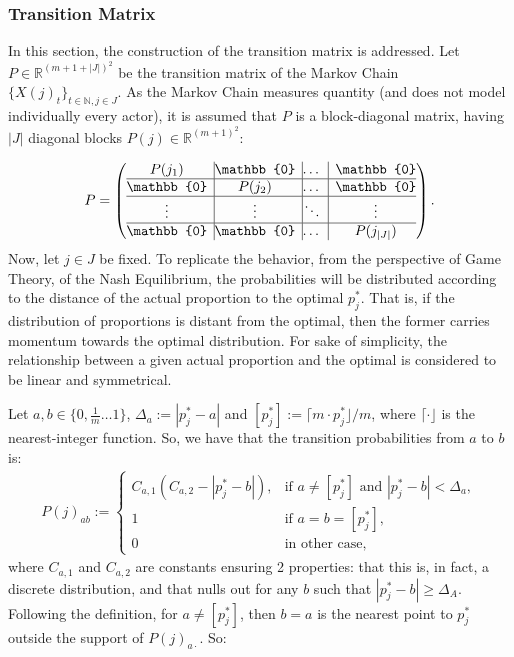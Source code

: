 \documentclass{article}
\begin{document}
\subsubsection{Transition Matrix}
In this section, the construction of the transition matrix is addressed.
Let $P \in \mathbb{R}^{(m+1+|J|)^2}$ be the transition matrix of the Markov Chain $\{X(j)_t\}_{t \in \mathds{N}, j \in J}$. As the Markov Chain measures quantity (and does not model individually every actor), it is assumed that $P$ is a block-diagonal matrix, having $|J|$ diagonal blocks $P(j) \in \mathbb{R}^{(m+1)^2}$:\par
\begin{align*}
	P =
	\left( \begin{array}{@{}c|@{}c|@{}c|c@{}}
		P(j_1) & \mathbb{0} & \dots & \mathbb{0}\\
		\hline
		\mathbb{0} & P(j_2) & \dots & \mathbb{0}\\
		\hline
		\vdots & \vdots & \ddots & \vdots\\
		\hline
		\mathbb{0} & \mathbb{0} & \dots & P(j_{|J|})\\
	\end{array}	\right).
\end{align*}
Now, let $j \in J$ be fixed. To replicate the behavior, from the perspective of Game Theory, of the Nash Equilibrium, the probabilities will be distributed according to the distance of the actual proportion to the optimal $p^*_j$. That is, if the distribution of proportions is distant from the optimal, then the former carries momentum towards the optimal distribution. For sake of simplicity, the relationship between a given actual proportion and the optimal is considered to be linear and symmetrical.\par
Let $a,b \in \{0,\frac{1}{m} \dots 1\}$, $\Delta_a := |p^*_j - a|$ and $[p^*_j] := \lceil m\cdot p^*_j\rfloor/m$, where $\lceil\cdot \rfloor$ is the nearest-integer function. So, we have that the transition probabilities from $a$ to $b$ is:
\begin{align*}
	P(j)_{ab} := \begin{cases}
		C_{a,1}(C_{a,2} - |p^*_j - b|), & \text{if } a \not = [p^*_j] \text{ and } |p^*_j - b| < \Delta_a,\\
		1 & \text{if } a = b = [p^*_j],\\
		0 & \text{in other case},
	\end{cases}
\end{align*}
where $C_{a,1}$ and $C_{a,2}$ are constants ensuring 2 properties: that this is, in fact, a discrete distribution, and that nulls out for any $b$ such that $|p^*_j - b| \geq \Delta_A$. Following the definition, for $a \not= [p^*_j]$, then $b = a$ is the nearest point to $p^*_j$ outside the support of $P(j)_{a \cdot}$. So:\par
\end{document}
